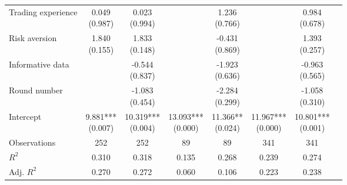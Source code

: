 \begin{threeparttable}
\begin{tabular}{lccccccc}
Trading experience & \makecell{0.049 \\ (0.987) } & \makecell{0.023 \\ (0.994) } &  & \makecell{1.236 \\ (0.766) } &  & \makecell{0.984 \\ (0.678) } \\
Risk aversion & \makecell{1.840 \\ (0.155) } & \makecell{1.833 \\ (0.148) } &  & \makecell{-0.431 \\ (0.869) } &  & \makecell{1.393 \\ (0.257) } \\
Informative data &  & \makecell{-0.544 \\ (0.837) } &  & \makecell{-1.923 \\ (0.636) } &  & \makecell{-0.963 \\ (0.565) } \\
Round number &  & \makecell{-1.083 \\ (0.454) } &  & \makecell{-2.284 \\ (0.299) } &  & \makecell{-1.058 \\ (0.310) } \\
Intercept & \makecell{9.881*** \\ (0.007) } & \makecell{10.319*** \\ (0.004) } & \makecell{13.093*** \\ (0.000) } & \makecell{11.366** \\ (0.024) } & \makecell{11.967*** \\ (0.000) } & \makecell{10.801*** \\ (0.001) } \\
\midrule
\addlinespace
Observations & 252 & 252 & 89 & 89 & 341 & 341 \\
$R^2$ & 0.310 & 0.318 & 0.135 & 0.268 & 0.239 & 0.274 \\
Adj. $R^2$ & 0.270 & 0.272 & 0.060 & 0.106 & 0.223 & 0.238 \\
\bottomrule
\end{tabular}
\footnotesize  
\end{threeparttable}
